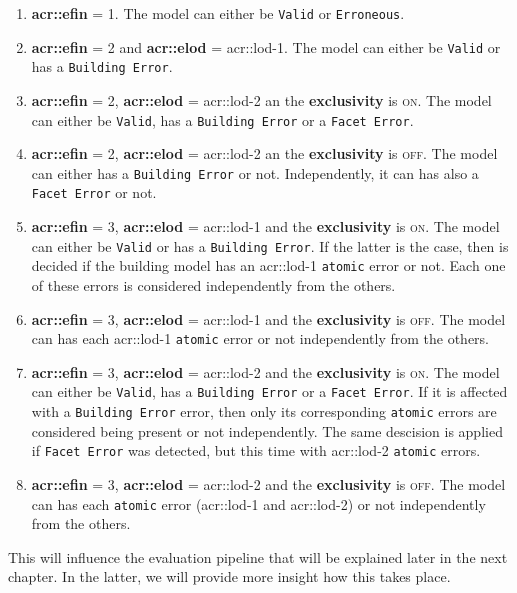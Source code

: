         \begin{enumerate}
            \item \textbf{\gls{acr::efin}} = 1.
                    The model can either be \texttt{Valid} or \texttt{Erroneous}.
            \item \textbf{\gls{acr::efin}} = 2 and \textbf{\gls{acr::elod}} = \gls{acr::lod}-1.
                    The model can either be \texttt{Valid} or has a \texttt{Building Error}.
            \item \textbf{\gls{acr::efin}} = 2, \textbf{\gls{acr::elod}} = \gls{acr::lod}-2 an the \textbf{exclusivity} is \textsc{on}.
                    The model can either be \texttt{Valid}, has a \texttt{Building Error} or a \texttt{Facet Error}.
            \item \textbf{\gls{acr::efin}} = 2, \textbf{\gls{acr::elod}} = \gls{acr::lod}-2 an the \textbf{exclusivity} is \textsc{off}.
                    The model can either has a \texttt{Building Error} or not.
                    Independently, it can has also a \texttt{Facet Error} or not.
            \item \textbf{\gls{acr::efin}} = 3, \textbf{\gls{acr::elod}} = \gls{acr::lod}-1 and the \textbf{exclusivity} is \textsc{on}.
                    The model can either be \texttt{Valid} or has a \texttt{Building Error}.
                    If the latter is the case, then is decided if the building model has an \gls{acr::lod}-1 \texttt{atomic} error or not.
                    Each one of these errors is considered independently from the others.
            \item \textbf{\gls{acr::efin}} = 3, \textbf{\gls{acr::elod}} = \gls{acr::lod}-1 and the \textbf{exclusivity} is \textsc{off}.
                    The model can has each \gls{acr::lod}-1 \texttt{atomic} error or not independently from the others.
            \item \textbf{\gls{acr::efin}} = 3, \textbf{\gls{acr::elod}} = \gls{acr::lod}-2 and the \textbf{exclusivity} is \textsc{on}.
                    The model can either be \texttt{Valid}, has a \texttt{Building Error} or a \texttt{Facet Error}.
                    If it is affected with a \texttt{Building Error} error, then only its corresponding \texttt{atomic} errors are considered being present or not independently.
                    The same descision is applied if \texttt{Facet Error} was detected, but this time with \gls{acr::lod}-2 \texttt{atomic} errors.
            \item \textbf{\gls{acr::efin}} = 3, \textbf{\gls{acr::elod}} = \gls{acr::lod}-2 and the \textbf{exclusivity} is \textsc{off}.
                    The model can has each \texttt{atomic} error (\gls{acr::lod}-1 and \gls{acr::lod}-2) or not independently from the others.
        \end{enumerate}

        This will influence the evaluation pipeline that will be explained later in the next chapter.
        In the latter, we will provide more insight how this takes place.
